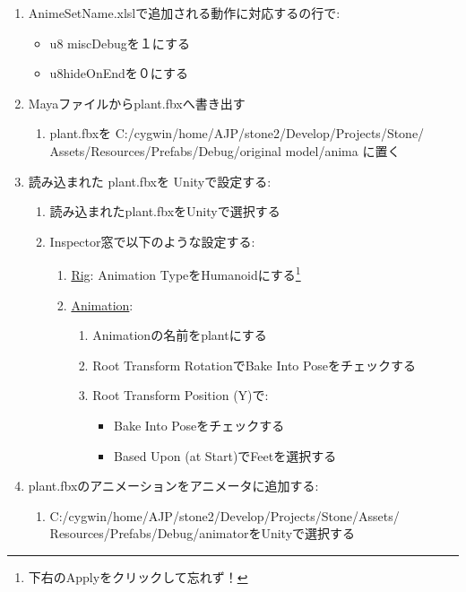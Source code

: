 \documentclass[a4paper]{report}
\newcommand{\tname}{{\ttfamily AnimeSetName.xlsl}}
\newcommand{\fbxname}{{\ttfamily plant.fbx}}
\begin{document}
\begin{enumerate}
	\item \tname で追加される動作に対応するの行で:\begin{itemize}
			\item u8 miscDebugを１にする
			\item u8hideOnEndを０にする
		\end{itemize}
	\item Mayaファイルから{\ttfamily plant.fbx}へ書き出す\begin{enumerate}
			\item \fbxname を {\ttfamily 
				C:/cygwin/home/AJP/stone2/Develop/Projects/Stone/}\\{\ttfamily Assets/Resources/Prefabs/Debug/original model/anima
				}に置く
		\end{enumerate}
	\item 読み込まれた \fbxname を Unityで設定する:
	\begin{enumerate}
		\item 読み込まれた\fbxname をUnityで選択する
		\item Inspector窓で以下のような設定する:
			\begin{enumerate}
				\item \underline{Rig}: Animation TypeをHumanoidにする\footnote{下右のApplyをクリックして忘れず！}
				\item \underline{Animation}:
					\begin{enumerate}
						\item Animationの名前をplantにする
						\item Root Transform RotationでBake Into Poseをチェックする
						\item Root Transform Position (Y)で:\begin{itemize}
								\item Bake Into Poseをチェックする
								\item Based Upon (at Start)でFeetを選択する
							\end{itemize}
					\end{enumerate}
			\end{enumerate}
	\end{enumerate}
\item \fbxname のアニメーションをアニメータに追加する:\begin{enumerate}
		\item {\ttfamily C:/cygwin/home/AJP/stone2/Develop/Projects/Stone/Assets/}\\{\ttfamily Resources/Prefabs/Debug/animator}をUnityで選択する

\end{enumerate}
\end{enumerate}
\end{document}
